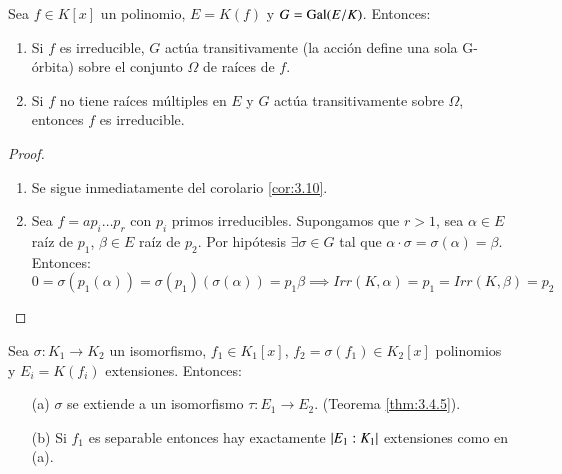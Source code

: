 \begin{pro} %
    Sea $f \in K[x]$ un polinomio, $E = K(f)$ y $G = \mathrm{Gal}(E/K)$. Entonces:
    \begin{enumerate}
        \item Si $f$ es irreducible, $G$ actúa transitivamente (la acción define una sola G-órbita) sobre el conjunto $\Omega$ de raíces de $f$.
        \item Si $f$ no tiene raíces múltiples en $E$ y $G$ actúa transitivamente sobre $\Omega$, entonces $f$ es irreducible.
    \end{enumerate}
\end{pro}
\begin{proof}$ $
    \begin{enumerate}
        \item Se sigue inmediatamente del corolario \ref{cor:3.10}.
        \item Sea $f = a p_i \ldots p_r$ con $p_i$ primos irreducibles. Supongamos que $r > 1$, sea $\alpha \in E$ raíz de $p_1$, $\beta \in E$ raíz de $p_2$. Por hipótesis $\exists \sigma \in G$ tal que $\alpha \cdot \sigma = \sigma(\alpha) = \beta$. Entonces:
        $$
            0 = \sigma(p_1(\alpha)) = \sigma(p_1)(\sigma(\alpha)) = p_1 \beta \implies Irr(K, \alpha) = p_1 = Irr(K, \beta) = p_2
        $$
    \end{enumerate}
\end{proof}

\begin{thm}\label{thm:3.4.6}
    Sea $\sigma: K_1 \to K_2$ un isomorfismo, $f_1 \in K_1[x]$, $f_2 = \sigma(f_1) \in K_2[x]$ polinomios y $E_i = K(f_i)$ extensiones. Entonces:
    \begin{itemize}
        \item[(a)] $\sigma$ se extiende a un isomorfismo $\tau: E_1 \to E_2$. (Teorema \ref{thm:3.4.5}).
        \item[(b)] Si $f_1$ es separable entonces hay exactamente $\left|E_1:K_1\right|$ extensiones como en (a).
    \end{itemize}
\end{thm}


